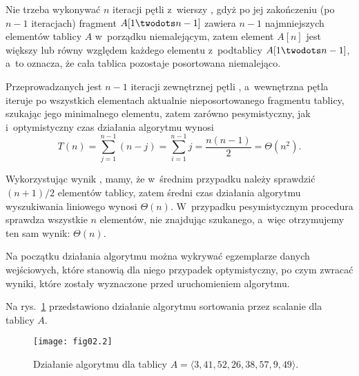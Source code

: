 Nie trzeba wykonywać $n$ iteracji pętli  z~wierszy \twodashes{\ref{li:selection-sort-for-begin}}{\ref{li:selection-sort-for-end}}, gdyż po jej zakończeniu (po $n-1$ iteracjach) fragment $A[1\twodots n-1]$ zawiera $n-1$ najmniejszych elementów tablicy $A$ w~porządku niemalejącym, zatem element $A[n]$ jest większy lub równy względem każdego elementu z~podtablicy $A[1\twodots n-1]$, a~to oznacza, że cała tablica pozostaje posortowana niemalejąco.

Przeprowadzanych jest $n-1$ iteracji zewnętrznej pętli , a~wewnętrzna pętla  iteruje po wszystkich elementach aktualnie nieposortowanego fragmentu tablicy, szukając jego minimalnego elementu, zatem zarówno pesymistyczny, jak i~optymistyczny czas działania algorytmu wynosi
\[
	T(n) = \sum_{j=1}^{n-1}(n-j) = \sum_{i=1}^{n-1}j = \frac{n(n-1)}{2} = \Theta(n^2).
\]

\exercise %
Wykorzystując wynik , mamy, że w~średnim przypadku należy sprawdzić $(n+1)/2$ elementów tablicy, zatem średni czas działania algorytmu wyszukiwania liniowego wynosi $\Theta(n)$. W~przypadku pesymistycznym procedura sprawdza wszystkie $n$ elementów, nie znajdując szukanego, a~więc otrzymujemy ten sam wynik: $\Theta(n)$.

\exercise %
Na początku działania algorytmu można wykrywać egzemplarze danych wejściowych, które stanowią dla niego przypadek optymistyczny, po czym zwracać wyniki, które zostały wyznaczone przed uruchomieniem algorytmu.


\exercise %
Na rys.~\ref{fig:2.3-1} przedstawiono działanie algorytmu sortowania przez scalanie dla tablicy $A$.
\begin{figure}[ht]
	\begin{center}
		\texttt{[image: fig02.2]}
	\end{center}
	\caption{Działanie algorytmu  dla tablicy $A=\langle3,41,52,26,38,57,9,49\rangle$.} \label{fig:2.3-1}
\end{figure}

